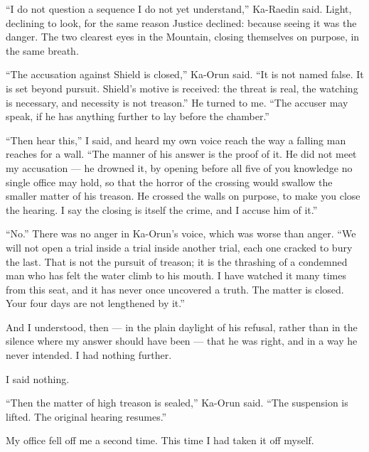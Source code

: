 ``I do not question a sequence I do not yet understand,'' Ka-Raedin said. Light, declining to look, for the same reason Justice declined: because seeing it was the danger. The two clearest eyes in the Mountain, closing themselves on purpose, in the same breath.\par
 
``The accusation against Shield is closed,'' Ka-Orun said. ``It is not named false. It is set beyond pursuit. Shield's motive is received: the threat is real, the watching is necessary, and necessity is not treason.'' He turned to me. ``The accuser may speak, if he has anything further to lay before the chamber.''\par
 
``Then hear this,'' I said, and heard my own voice reach the way a falling man reaches for a wall. ``The manner of his answer is the proof of it. He did not meet my accusation --- he drowned it, by opening before all five of you knowledge no single office may hold, so that the horror of the crossing would swallow the smaller matter of his treason. He crossed the walls on purpose, to make you close the hearing. I say the closing is itself the crime, and I accuse him of it.''\par

``No.'' There was no anger in Ka-Orun's voice, which was worse than anger. ``We will not open a trial inside a trial inside another trial, each one cracked to bury the last. That is not the pursuit of treason; it is the thrashing of a condemned man who has felt the water climb to his mouth. I have watched it many times from this seat, and it has never once uncovered a truth. The matter is closed. Your four days are not lengthened by it.''\par

And I understood, then --- in the plain daylight of his refusal, rather than in the silence where my answer should have been --- that he was right, and in a way he never intended. I had nothing further.\par
 
I said nothing.\par
 
``Then the matter of high treason is sealed,'' Ka-Orun said. ``The suspension is lifted. The original hearing resumes.''\par
 
My office fell off me a second time. This time I had taken it off myself.\par
 
